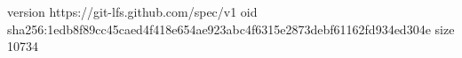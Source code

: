version https://git-lfs.github.com/spec/v1
oid sha256:1edb8f89cc45caed4f418e654ae923abc4f6315e2873debf61162fd934ed304e
size 10734
